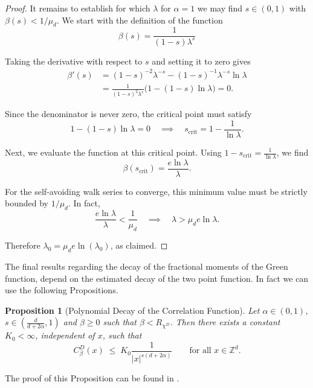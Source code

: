 \documentclass[11pt, a4paper, UKenglish, oneside]{book}
\theoremstyle{plain}
\newtheorem{proposition}[theorem]{Proposition}
\theoremstyle{remark}
\theoremstyle{definition}
\numberwithin{equation}{section}
\numberwithin{theorem}{section}
\begin{document}
\begin{proof}
It remains to establish for which $\lambda$ for $\alpha =1 $ we may find $s \in (0,1)$ with $\beta(s) < 1/\mu_d$. We start with the definition of the function
\begin{equation*}
    \beta(s) = \frac{1}{(1-s)\lambda^s} 
\end{equation*}
 
Taking the derivative with respect to $s$ and setting it to zero gives
\begin{align*}
    \beta'(s) &= (1-s)^{-2} \lambda^{-s} - (1-s)^{-1} \lambda^{-s} \ln \lambda \\
    &= \frac{1}{(1-s)^2 \lambda^s} \big( 1 - (1-s)\ln \lambda \big) = 0.
\end{align*}
 
Since the denominator is never zero, the critical point must satisfy
\begin{equation*}
    1 - (1-s)\ln \lambda = 0 \quad \implies  \quad s_{\mathrm{crit}} = 1 - \frac{1}{\ln \lambda}.
\end{equation*}
 
Next, we evaluate the function at this critical point. Using $1-s_{\mathrm{crit}} = \frac{1}{\ln \lambda}$, we find
\begin{equation*}
    \beta(s_{\mathrm{crit}}) = \frac{e \ln \lambda}{\lambda}.
\end{equation*}
 
For the self-avoiding walk series to converge, this minimum value must be strictly bounded by $1/\mu_d$. In fact,
\begin{equation*}
    \frac{e \ln \lambda}{\lambda} < \frac{1}{\mu_d} \quad \implies \quad \lambda > \mu_d e \ln \lambda.
\end{equation*}
 
Therefore $\lambda_0 = \mu_d e \ln (\lambda_0)$, as claimed.
\end{proof}

The final results regarding the decay of the fractional moments of the Green function, depend on the estimated decay of the two point function. In fact we can use the following Propositions.
\begin{proposition}[Polynomial Decay of the Correlation Function]
Let $\alpha \in (0,1)$, $s \in (\frac{d}{d+2\alpha},1)$ and $\beta \ge 0$ such that $\beta < R_{\chi^D}$. Then there exists a constant $K_0 < \infty$, independent of $x$, such that
\[
C_\beta^D(x) \;\le\; K_0 \frac{1}{|x|^{s(d+2\alpha)}} \qquad \text{for all } x \in \mathbb{Z}^d.
\]
\end{proposition}
The proof of this Proposition can be found in \cite[Lemma 2.4]{Chen_2015}.
\end{document}
